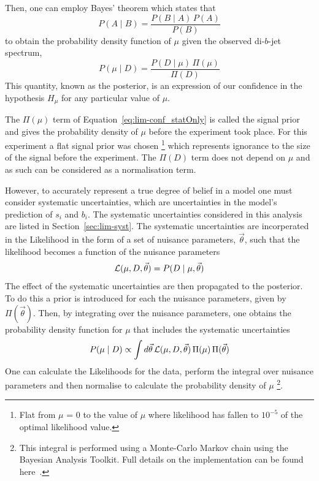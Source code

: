 \noindent
Then, one can employ Bayes' theorem which states that
\begin{equation}
  P(A \mid B) = \frac{P(B \mid A) \, P(A)}{P(B)}
\end{equation}
to obtain the probability density function of $\mu$ given the observed di-$b$-jet spectrum,
\begin{equation}
  P(\mu \mid D) = \frac{ P(D \mid \mu) \, \Pi( \mu ) }{ \Pi( D ) }
  \label{eq:lim-conf_statOnly}
\end{equation}
This quantity, known as the posterior, is an expression of our confidence in the hypothesis
$H_\mu$ for any particular value of $\mu$.

The $\Pi( \mu )$ term of Equation~\ref{eq:lim-conf_statOnly} is called the signal prior
and gives the probability density of $\mu$ before the experiment took place.
For this experiment a flat signal prior was chosen
\footnote{Flat from $\mu$ = 0 to the value of $\mu$ where
likelihood has fallen to $10^{-5}$ of the optimal likelihood value.}
which represents ignorance to the size of the signal before the experiment.
The $\Pi(D)$ term does not depend on $\mu$ and as such can be considered as a normalisation term.

However, to accurately represent a true degree of belief in a model one must consider systematic uncertainties,
which are uncertainties in the model's prediction of $s_i$ and $b_i$.
The systematic uncertainties considered in this analysis are listed in Section~\ref{sec:lim-syst}.
The systematic uncertainties are incorperated in the Likelihood in the form of a set of nuisance parameters, $\vec{\theta}$,
such that the likelihood becomes a function of the nuisance parameters
\begin{equation}
  \mathcal{L} (\mu,D,\vec{\theta}) = P(D \mid \mu, \vec{\theta} ) 
\end{equation}
The effect of the systematic uncertainties are then propagated to the posterior. %
To do this a prior is introduced for each the nuisance parameters, given by $\Pi(\vec{\theta})$.
Then, by integrating over the nuisance parameters,
one obtains the probability density function for $\mu$ that includes the systematic uncertainties
\begin{equation}
  P(\mu \mid D) \propto \int d \vec{\theta} \, \mathcal{L} (\mu, D, \vec{\theta} ) \, \Pi( \mu )  \, \Pi(\vec{\theta})
  \label{eq:lim-conf_syst}
\end{equation}
One can calculate the Likelihoods for the data,
perform the integral over nuisance parameters
and then normalise to calculate the probability density of $\mu$
\footnote{This integral is performed using a Monte-Carlo Markov chain using the Bayesian Analysis Toolkit.
 Full details on the implementation can be found here~\cite{det-thesis_kate}.}.

